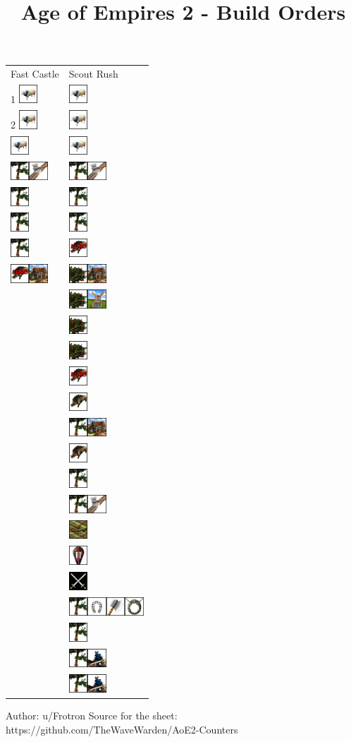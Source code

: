 \documentclass[11pt]{article}
\date{}
\title{Age of Empires 2 - Build Orders}
\newcommand{\imagew}{0.7cm}
\newcommand{\imagespace}{2mm}
\newcommand{\berries}{\includegraphics[width=\imagew]{icons/berries.png}\hspace{\imagespace}}
\newcommand{\boar}{\includegraphics[width=\imagew]{icons/boar.png}\hspace{\imagespace}}
\newcommand{\boarlure}{\includegraphics[width=\imagew]{icons/boarlure.png}\hspace{\imagespace}}
\newcommand{\scout}{\includegraphics[width=\imagew]{icons/scout.png}\hspace{\imagespace}}
\newcommand{\sheep}{\includegraphics[width=\imagew]{icons/sheep.png}\hspace{\imagespace}}
\newcommand{\tree}{\includegraphics[width=\imagew]{icons/tree.png}\hspace{\imagespace}}
\newcommand{\house}{\includegraphics[width=\imagew]{icons/house.png}\hspace{\imagespace}}
\newcommand{\lumber}{\includegraphics[width=\imagew]{icons/lumber.png}\hspace{\imagespace}}
\newcommand{\mill}{\includegraphics[width=\imagew]{icons/mill.png}\hspace{\imagespace}}
\newcommand{\barracks}{\includegraphics[width=\imagew]{icons/barracks.png}\hspace{\imagespace}}
\newcommand{\feudal}{\includegraphics[width=\imagew]{icons/feudal.png}\hspace{\imagespace}}
\newcommand{\loom}{\includegraphics[width=\imagew]{icons/loom.png}\hspace{\imagespace}}
\newcommand{\stable}{\includegraphics[width=\imagew]{icons/stable.png}\hspace{\imagespace}}
\newcommand{\doublebitaxe}{\includegraphics[width=\imagew]{icons/doublebitaxe.png}\hspace{\imagespace}}
\newcommand{\horsecollar}{\includegraphics[width=\imagew]{icons/horsecollar.png}\hspace{\imagespace}}
\begin{document}

\begin{center}
\begin{tabular}{ |m{}|m{}|}
  Fast Castle& Scout Rush \\ 
 1 \sheep & \sheep \\ 
 2 \sheep & \sheep \\ 
 \sheep & \sheep \\ 
 \tree \lumber & \tree \lumber \\ 
 \tree & \tree \\ 
 \tree & \tree \\ 
 \tree & \boarlure \\ 
 \boarlure \house & \berries \house\\ 
 & \berries \mill \\
 & \berries \\
 & \berries \\
 & \boarlure \\
 & \boar \\
 & \tree \house \\
 & \boar \\
 & \tree \\
 & \tree \lumber \\
 & \loom \\
 & \feudal \\
 & \barracks \\
 & \tree \stable \doublebitaxe \horsecollar \\
 & \tree \\
 & \tree \scout \\
 & \tree \scout \\
\end{tabular}

\vspace{2mm}
\tiny
Author: u/Frotron
Source for the sheet: https://github.com/TheWaveWarden/AoE2-Counters

\end{center}
\end{document}
